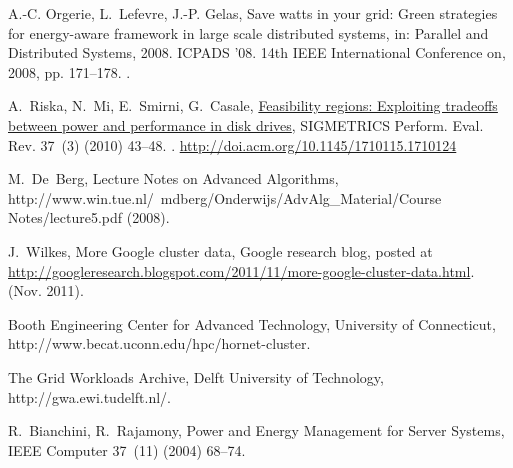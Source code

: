 \documentclass[preprint,12pt]{elsarticle}
\begin{document}
\begin{thebibliography}{10}
A.-C. Orgerie, L.~Lefevre, J.-P. Gelas, Save watts in your grid: Green
  strategies for energy-aware framework in large scale distributed systems, in:
  Parallel and Distributed Systems, 2008. ICPADS '08. 14th IEEE International
  Conference on, 2008, pp. 171--178.
\newblock \href {http://dx.doi.org/10.1109/ICPADS.2008.97}
  {}.

A.~Riska, N.~Mi, E.~Smirni, G.~Casale,
  \href{http://doi.acm.org/10.1145/1710115.1710124}{Feasibility regions:
  Exploiting tradeoffs between power and performance in disk drives},
  SIGMETRICS Perform. Eval. Rev. 37~(3) (2010) 43--48.
\newblock \href {http://dx.doi.org/10.1145/1710115.1710124}
  {}.
\newline\urlprefix\url{http://doi.acm.org/10.1145/1710115.1710124}

M.~De~Berg, {Lecture Notes on Advanced Algorithms},
  http://www.win.tue.nl/~mdberg/Onderwijs/AdvAlg\_Material/Course
  Notes/lecture5.pdf (2008).

J.~Wilkes, More {Google} cluster data, Google research blog, posted at
  \url{http://googleresearch.blogspot.com/2011/11/more-google-cluster-data.html}.
  (Nov. 2011).

{Booth Engineering Center for Advanced Technology, University of Connecticut},
  http://www.becat.uconn.edu/hpc/hornet-cluster.

{The Grid Workloads Archive, Delft University of Technology},
  http://gwa.ewi.tudelft.nl/.

R.~Bianchini, R.~Rajamony, {Power and Energy Management for Server Systems},
  IEEE Computer 37~(11) (2004) 68--74.

\end{thebibliography}
\end{document}
